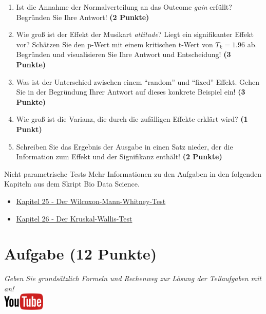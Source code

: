 \documentclass[a4paper, 10pt]{scrartcl}\usepackage[]{graphicx}\usepackage[]{xcolor}
\begin{document}
\begin{enumerate}
\item Ist die Annahme der Normalverteilung an das Outcome \textit{gain} erf{\"u}llt?
  Begr{\"u}nden Sie Ihre Antwort! \textbf{(2 Punkte)}
\item Wie gro{\ss} ist der Effekt der Musikart \textit{attitude}? Liegt ein signifikanter
  Effekt vor? Sch{\"a}tzen Sie den p-Wert mit einem kritischen t-Wert von $T_k
  = 1.96$ ab. Begr{\"u}nden und visualisieren Sie Ihre Antwort und
  Entscheidung! \textbf{(3 Punkte)}
\item Was ist der Unterschied zwischen einem "`random"' und "`fixed"'
  Effekt. Gehen Sie in der Begr{\"u}ndung Ihrer Antwort auf dieses konkrete
  Beispiel ein! \textbf{(3 Punkte)}
\item Wie gro{\ss} ist die Varianz, die durch die zuf{\"a}lligen Effekte erkl{\"a}rt wird? \textbf{(1 Punkt)}
\item Schreiben Sie das Ergebnis der \Rlogo Ausgabe in einen Satz nieder, der die
  Information zum Effekt und der Signifikanz enth{\"a}lt! \textbf{(2 Punkte)}
\end{enumerate}
 
\clearpage
\begin{graybox}{Nicht parametrische Tests}
Mehr Informationen zu den Aufgaben in den folgenden Kapiteln aus dem Skript Bio Data Science.
  \begin{itemize}
  \item \href{https://jkruppa.github.io/stat-tests-utest.html}{Kapitel 25 - Der Wilcoxon-Mann-Whitney-Test}
  \item \href{https://jkruppa.github.io/stat-tests-kruskal.html}{Kapitel 26 - Der Kruskal-Wallis-Test}
  \end{itemize}
\end{graybox}
\clearpage

\section{Aufgabe \hfill (12 Punkte)}

\textit{Geben Sie grunds{\"a}tzlich Formeln und Rechenweg zur L{\"o}sung der
  Teilaufgaben mit an!} \\[1Ex]

\hfill\href{https://youtu.be/ArHA6MZOEOw}{\includegraphics[width =
  2cm]{img/youtube}} %
\hspace{2Ex}
\end{document}
